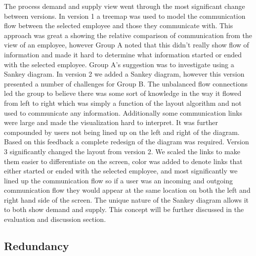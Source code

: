 \message{ !name(FinalPaper.tex)}\documentclass[journal]{vgtc}                %
\begin{document}
The process demand and supply view went through the most significant change between versions.  In version 1 a treemap was used to model the communication flow between the selected employee and those they communicate with.  This approach was great a showing the relative comparison of communication from the view of an employee, however Group A noted that this didn't really show flow of information and made it hard to determine what information started or ended with the selected employee.  Group A's suggestion was to investigate using a Sankey diagram.
In version 2 we added a Sankey diagram, however this version presented a number of challenges for Group B.  The unbalanced flow connections led the group to believe there was some sort of knowledge in the way it flowed from left to right which was simply a function of the layout algorithm and not used to communicate any information.  Additionally some communication links were large and made the visualization hard to interpret.  It was further compounded by users not being lined up on the left and right of the diagram.  Based on this feedback a complete redesign of the diagram was required.
Version 3 significantly changed the layout from version 2.  We scaled the links to make them easier to differentiate on the screen, color was added to denote links that either started or ended with the selected employee, and most significantly we lined up the communication flow so if a user was an incoming and outgoing communication flow they would appear at the same location on both the left and right hand side of the screen.
The unique nature of the Sankey diagram allows it to both show demand and supply.  This concept will be further discussed in the evaluation and discussion section.

\subsection{Redundancy}
\end{document}
